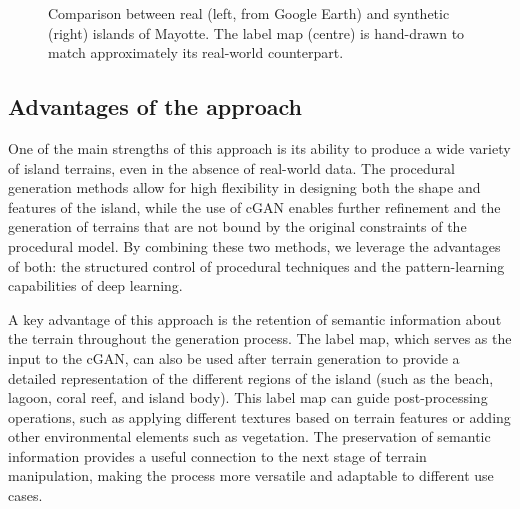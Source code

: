 \begin{figure}
\caption{Comparison between real (left, from Google Earth) and synthetic (right) islands of Mayotte. The label map (centre) is hand-drawn to match approximately its real-world counterpart.}
\label{fig:coral-island-example-Mayotte}
\end{figure}








\subsection{Advantages of the approach}
\label{sec:coral-island-advantages}

One of the main strengths of this approach is its ability to produce a wide variety of island terrains, even in the absence of real-world data. The procedural generation methods allow for high flexibility in designing both the shape and features of the island, while the use of cGAN enables further refinement and the generation of terrains that are not bound by the original constraints of the procedural model. By combining these two methods, we leverage the advantages of both: the structured control of procedural techniques and the pattern-learning capabilities of deep learning.

A key advantage of this approach is the retention of semantic information about the terrain throughout the generation process. The label map, which serves as the input to the cGAN, can also be used after terrain generation to provide a detailed representation of the different regions of the island (such as the beach, lagoon, coral reef, and island body). This label map can guide post-processing operations, such as applying different textures based on terrain features or adding other environmental elements such as vegetation. The preservation of semantic information provides a useful connection to the next stage of terrain manipulation, making the process more versatile and adaptable to different use cases.


